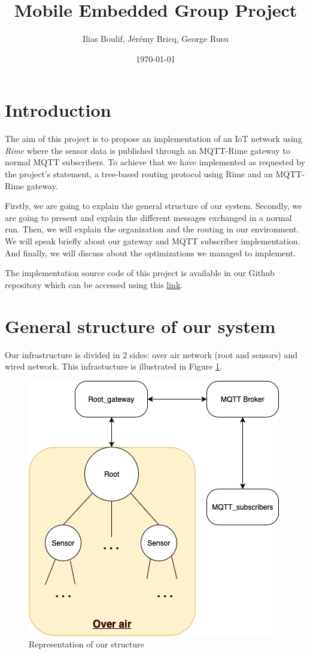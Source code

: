 \documentclass[a4paper,10pt]{article}
\title{Mobile Embedded Group Project}
\author{Ilias Boulif, Jérémy Bricq, George Rusu}
\date{\today}
\begin{document}
\maketitle
\section{Introduction}

The aim of this project is to propose an implementation of an IoT network using \textit{Rime} where the sensor data is published through an MQTT-Rime gateway to normal MQTT subscribers. To achieve that we have implemented as requested by the project's statement, a tree-based routing protocol using Rime and an MQTT-Rime gateway.

Firstly, we are going to explain the general structure of our system. Secondly, we are going to present and explain the different messages exchanged in a normal run. Then, we will explain the organization and the routing in our environment. We will speak briefly about our gateway and MQTT subscriber implementation. And finally, we will discuss about the optimizations we managed to implement.

The implementation source code of this project is available in our Github repository which can be accessed using this \href{https://github.com/georgesrusu/MobileEmbeddedComputing}{link}.


\section{General structure of our system}
Our infrastructure is divided in 2 sides: over air network (root and sensors) and wired network. This infrastucture is illustrated in Figure \ref{fig:fig1}.

\begin{figure}[!htb]
\centering
\includegraphics[scale=0.5]{./img/structure.png}
\caption{Representation of our structure}
\label{fig:fig1}
\end{figure}
\end{document}
